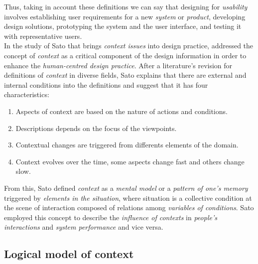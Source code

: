 Thus, taking in account these definitions we can say that designing for 
\textit{usability} involves establishing user requirements for a new
\textit{system} or \textit{product}, developing design solutions,
prototyping the system and the user interface, and testing it with
representative users.\\
In the study of Sato \cite{sato2004context} that brings \textit{context
issues} into design practice, addressed the concept of
\textit{context} as a critical component of the design information in
order to enhance the \textit{human-centred design practice}. After a
literature's revision for  definitions of \textit{context} in diverse
fields, Sato explains that there are external and internal conditions
into the definitions and suggest that it has four characteristics:
\begin{enumerate}  
\item Aspects of context are based on the nature of actions and 
conditions.
\item Descriptions depends on the focus of the viewpoints.
\item Contextual changes are triggered from differents elements 
of the domain. 
\item Context evolves over the time, some aspects change fast
and others change slow. 
\end{enumerate} 
From this, Sato defined \textit{context} as a \textit{mental model} or a
\textit{pattern of one's memory} triggered by \textit{elements in the
situation}, where situation is a collective condition at the scene of
interaction composed of relations among \textit{variables of
conditions}. Sato employed this concept to describe the
\textit{influence of contexts} in \textit{people's interactions} and
\textit{system performance} and vice versa.

\subsection{Logical model of context} 

